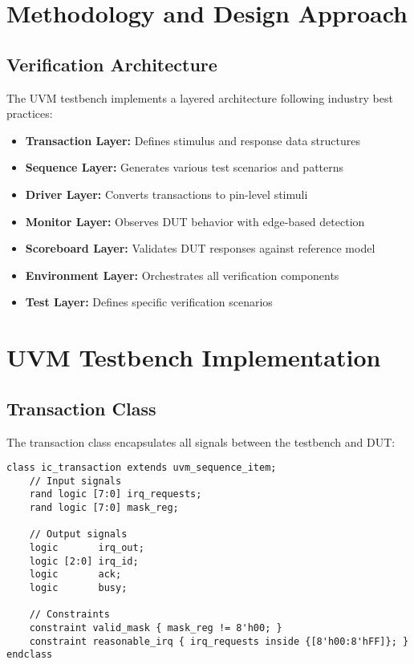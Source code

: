 \documentclass[12pt,a4paper]{article}
\begin{document}
\section{Methodology and Design Approach}

\subsection{Verification Architecture}
The UVM testbench implements a layered architecture following industry best practices:

\begin{itemize}
    \item \textbf{Transaction Layer:} Defines stimulus and response data structures
    \item \textbf{Sequence Layer:} Generates various test scenarios and patterns
    \item \textbf{Driver Layer:} Converts transactions to pin-level stimuli
    \item \textbf{Monitor Layer:} Observes DUT behavior with edge-based detection
    \item \textbf{Scoreboard Layer:} Validates DUT responses against reference model
    \item \textbf{Environment Layer:} Orchestrates all verification components
    \item \textbf{Test Layer:} Defines specific verification scenarios
\end{itemize}

\section{UVM Testbench Implementation}
\subsection{Transaction Class}
The transaction class encapsulates all signals between the testbench and DUT:

\begin{lstlisting}[caption=Transaction Class Implementation]
class ic_transaction extends uvm_sequence_item;
    // Input signals
    rand logic [7:0] irq_requests;
    rand logic [7:0] mask_reg;
    
    // Output signals
    logic       irq_out;
    logic [2:0] irq_id;
    logic       ack;
    logic       busy;

    // Constraints
    constraint valid_mask { mask_reg != 8'h00; }
    constraint reasonable_irq { irq_requests inside {[8'h00:8'hFF]}; }
endclass
\end{lstlisting}
\end{document}
